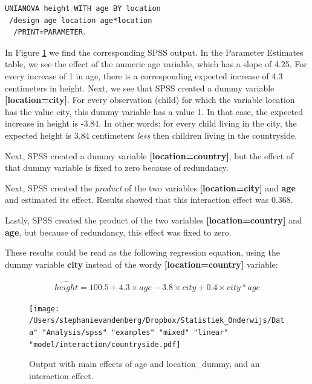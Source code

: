 \documentclass[]{report}\usepackage[]{graphicx}\usepackage[]{color}
\begin{document}
\begin{verbatim}
UNIANOVA height WITH age BY location
 /design age location age*location
  /PRINT=PARAMETER.
\end{verbatim}


In Figure \ref{fig:interactionheight} we find the corresponding SPSS output. In the Parameter Estimates table, we see the effect of the numeric age variable, which has a slope of 4.25. For every increase of 1 in age, there is a corresponding expected increase of 4.3 centimeters in height. Next, we see that SPSS created a dummy variable \textbf{[location=city]}. For every observation (child) for which the variable location has the value city, this dummy variable has a value 1. In that case, the expected increase in height is -3.84. In other words: for every child living in the city, the expected height is 3.84 centimeters \textit{less} then children living in the countryside. 

Next, SPSS created a dummy variable \textbf{[location=country]}, but the effect of that dummy variable is fixed to zero because of redundancy.

Next, SPSS created the \textit{product} of the two variables \textbf{[{location=city}]} and \textbf{age} and estimated its effect. Results showed that this interaction effect was 0.368.  

Lastly, SPSS created the product of the two variables \textbf{[{location=country}]} and \textbf{age}, but because of redundancy, this effect was fixed to zero.

These results could be read as the following regression equation, using the dummy variable \textbf{city} instead of the wordy \textbf{[{location=country}]} variable:

\begin{eqnarray}
\widehat{height} = 100.5  + 4.3  \times age -3.8 \times city + 0.4 \times city*age 
\end{eqnarray}





\begin{figure}[h]
    \begin{center}
       \texttt{[image: /Users/stephanievandenberg/Dropbox/Statistiek\_Onderwijs/Data" "Analysis/spss" "examples" "mixed" "linear" "model/interaction/countryside.pdf]}
    \end{center}
    \label{fig:interactionheight}
    \caption{Output with main effects of age and location\_dummy, and an interaction effect.}
\end{figure}
\end{document}
